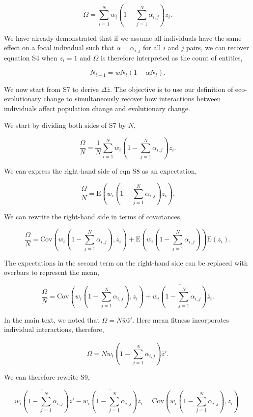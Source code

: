 \documentclass[
]{article}
\begin{document}
\[\Omega = \sum_{i=1}^{N}w_{i}\left(1 - \sum_{j=1}^{N}\alpha_{i, j}\right)z_{i}.
\tag{S7}
\]

We have already demonstrated that if we assume all individuals have the
same effect on a focal individual such that \(\alpha = \alpha_{i,j}\)
for all \(i\) and \(j\) pairs, we can recover equation S4 when
\(z_{i} = 1\) and \(\Omega\) is therefore interpreted as the count of
entities,

\[N_{t+1} = \bar{w} N_{t} \left(1 - \alpha N_{t}\right).\]

We now start from S7 to derive \(\Delta \bar{z}\). The objective is to
use our definition of eco-evolutionary change to simultaneously recover
how interactions between individuals affect population change and
evolutionary change.

We start by dividing both sides of S7 by \(N\),

\[\frac{\Omega}{N} = \frac{1}{N}\sum_{i=1}^{N}w_{i}\left(1 - \sum_{j=1}^{N}\alpha_{i, j}\right)z_{i}.
\tag{S8}
\]

We can express the right-hand side of eqn S8 as an expectation,

\[\frac{\Omega}{N} = \mathrm{E}\left(w_{i}\left(1 - \sum_{j=1}^{N}\alpha_{i, j}\right)z_{i}\right).
\tag{S9}
\]

We can rewrite the right-hand side in terms of covariances,

\[\frac{\Omega}{N} = \mathrm{Cov}\left(w_{i}\left(1 - \sum_{j=1}^{N}\alpha_{i, j}\right), z_{i}  \right) + \mathrm{E}\left(w_{i}\left(1 - \sum_{j=1}^{N}\alpha_{i, j}\right)\right)\mathrm{E}\left(z_{i}\right). 
\tag{S9}
\]

The expectations in the second term on the right-hand side can be
replaced with overbars to represent the mean,

\[\frac{\Omega}{N} = \mathrm{Cov}\left(w_{i}\left(1 - \sum_{j=1}^{N}\alpha_{i, j}\right), z_{i}  \right) + \overline{w_{i}\left(1 - \sum_{j=1}^{N}\alpha_{i, j}\right)}    \bar{z}_{i}. 
\tag{S9}
\]

In the main text, we noted that \(\Omega = N\bar{w}\bar{z}'\). Here mean
fitness incorporates individual interactions, therefore,

\[\Omega = N\overline{w_{i}\left(1 - \sum_{j=1}^{N}\alpha_{i, j}\right)}\bar{z}'.
\tag{S10}
\]

We can therefore rewrite S9,

\[\overline{w_{i}\left(1 - \sum_{j=1}^{N}\alpha_{i, j}\right)}\bar{z}' -  \overline{w_{i}\left(1 - \sum_{j=1}^{N}\alpha_{i, j}\right)}    \bar{z}_{i} = \mathrm{Cov}\left(w_{i}\left(1 - \sum_{j=1}^{N}\alpha_{i, j}\right), z_{i}  \right). 
\tag{S11}
\]
\end{document}
